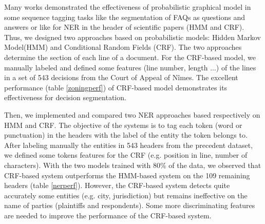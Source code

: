 \documentclass[runningheads,a4paper]{llncs}
\begin{document}
\par Many works demonstrated the effectiveness of probabilistic graphical model in some sequence tagging tasks like the segmentation of FAQs as questions and answers\cite{mccallum2000maxent} or like for NER in the header of scientific papers (HMM and CRF\cite{peng-mccallum2004crf}). Thus, we designed two approaches based on probabilistic models: Hidden Markov Model(HMM) and Conditional Random Fields (CRF). The two approaches determine the section of each line of a document. For the CRF-based model, we manually labeled and defined some features (line number, length ...) of the lines in a set of 543 decisions from the Court of Appeal of Nîmes. The excellent performance (table \ref{zoningperf}) of CRF-based model demonstrates its effectiveness for decision segmentation.
\begin{table}[!ht]
    \hfill
    \caption{Evaluation of HMM-based and CRF-based segmentation on 109 decisions}
    \label{zoningperf}
  \end{table}
  
Then, we implemented and compared two NER approaches based respectively on HMM and CRF. The objective of the systems is to tag each token (word or punctuation) in the headers with the label of the entity the token belongs to. After labeling  manually the entities in 543 headers from the precedent dataset, we defined some tokens features for the CRF (e.g. position in line, number of characters). With the two models trained with 80\% of the data, we observed that CRF-based system outperforms the HMM-based system on the 109 remaining headers (table \ref{nerperf}). However, the CRF-based system detects quite accurately some entities (e.g. city, jurisdiction) but remains ineffective on the name of parties (plaintiffs and respondents). Some more discriminating features are needed to improve the performance of the CRF-based system.
\end{document}
